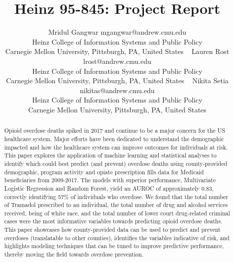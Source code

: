 \documentclass[twoside,10.5pt]{article}
\begin{document}
\title{Heinz 95-845: Project Report}

\author{\name Mridul Gangwar \email mgangwar@andrew.cmu.edu \\
       \addr Heinz College of Information Systems and Public Policy\\
       Carnegie Mellon University, Pittsburgh, PA, United States \
       \AND
       \name Lauren Rost \email lrost@andrew.cmu.edu \\
       \addr Heinz College of Information Systems and Public Policy\\
       Carnegie Mellon University, Pittsburgh, PA, United States \
       \AND
       \name Nikita Setia \email nikitas@andrew.cmu.edu \\
       \addr Heinz College of Information Systems and Public Policy\\
       Carnegie Mellon University, Pittsburgh, PA, United States}
       
\maketitle
\vspace*{5px}
\begin{abstract}
Opioid overdose deaths spiked in 2017 and continue to be a major concern for the US healthcare system. Major efforts have been dedicated to understand the demographic impacted and how the healthcare system can improve outcomes for individuals at risk. This paper explores the application of machine learning and statistical analyses to identify which could best predict (and prevent) overdose deaths using county-provided demographic, program activity and opiate prescription fills data for Medicaid beneficiaries from 2009-2017. The models with superior performance, Multivariate Logistic Regression and Random Forest, yield an AUROC of approximately 0.83, correctly identifying 57\% of individuals who overdose. We found that the total number of Tramadol prescribed to an individual, the total number of drug and alcohol services received, being of white race, and the total number of lower court drug-related criminal cases were the most informative variables towards predicting opioid overdose deaths. This paper showcases how county-provided data can be used to predict and prevent overdoses (translatable to other counties), identifies the variables indicative of risk, and highlights modeling techniques that can be tuned to improve predictive performance, thereby moving the field towards overdose prevention.  
\end{abstract}
\end{document}

